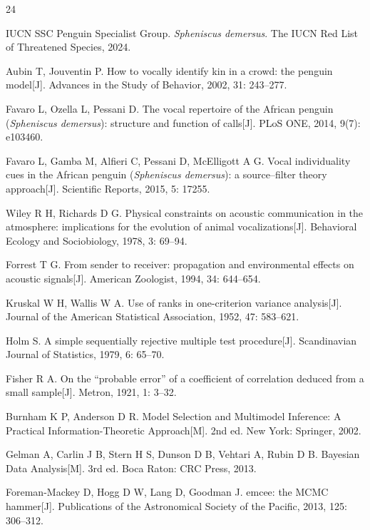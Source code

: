 \documentclass{apmcmthesis}
\begin{document}
\begingroup
\scriptsize
\begin{thebibliography}{24}

 IUCN SSC Penguin Specialist Group. \textit{Spheniscus demersus}. The IUCN Red List of Threatened Species, 2024.

 Aubin T, Jouventin P. How to vocally identify kin in a crowd: the penguin model[J]. Advances in the Study of Behavior, 2002, 31: 243--277.

 Favaro L, Ozella L, Pessani D. The vocal repertoire of the African penguin (\textit{Spheniscus demersus}): structure and function of calls[J]. PLoS ONE, 2014, 9(7): e103460.

 Favaro L, Gamba M, Alfieri C, Pessani D, McElligott A G. Vocal individuality cues in the African penguin (\textit{Spheniscus demersus}): a source--filter theory approach[J]. Scientific Reports, 2015, 5: 17255.

 Wiley R H, Richards D G. Physical constraints on acoustic communication in the atmosphere: implications for the evolution of animal vocalizations[J]. Behavioral Ecology and Sociobiology, 1978, 3: 69--94.

 Forrest T G. From sender to receiver: propagation and environmental effects on acoustic signals[J]. American Zoologist, 1994, 34: 644--654.

 Kruskal W H, Wallis W A. Use of ranks in one-criterion variance analysis[J]. Journal of the American Statistical Association, 1952, 47: 583--621.

 Holm S. A simple sequentially rejective multiple test procedure[J]. Scandinavian Journal of Statistics, 1979, 6: 65--70.

 Fisher R A. On the ``probable error'' of a coefficient of correlation deduced from a small sample[J]. Metron, 1921, 1: 3--32.

 Burnham K P, Anderson D R. Model Selection and Multimodel Inference: A Practical Information-Theoretic Approach[M]. 2nd ed. New York: Springer, 2002.

 Gelman A, Carlin J B, Stern H S, Dunson D B, Vehtari A, Rubin D B. Bayesian Data Analysis[M]. 3rd ed. Boca Raton: CRC Press, 2013.

 Foreman-Mackey D, Hogg D W, Lang D, Goodman J. emcee: the MCMC hammer[J]. Publications of the Astronomical Society of the Pacific, 2013, 125: 306--312.


\end{thebibliography}
\end{document}
